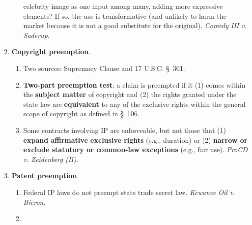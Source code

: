 \begin{enumerate}
\begin{enumerate}
        celebrity image as one input among many, adding more expressive 
        elements? If so, the use is transformative (and unlikely to harm the 
        market because it is not a good substitute for the original). 
        \emph{Comedy III v. Saderup}.
    \end{enumerate}
    \item \textbf{Copyright preemption}.
    \begin{enumerate}
        \item Two sources: Supremacy Clause and 17 U.S.C. \S\ 301.
        \item \textbf{Two-part preemption test}: a claim is preempted if it 
        (1) comes within the \textbf{subject matter} of copyright and (2) the 
        rights granted under the state law are \textbf{equivalent} to any of 
        the exclusive rights within the general scope of copyright as defined 
        in \S\ 106.
        \item Some contracts involving IP are enforceable, but not those that 
        (1) \textbf{expand affirmative exclusive rights} (e.g., duration) or 
        (2) \textbf{narrow or exclude statutory or common-law exceptions} 
        (e.g., fair use). \emph{ProCD v. Zeidenberg (II)}.
    \end{enumerate}
    \item \textbf{Patent preemption}.
    \begin{enumerate}
        \item Federal IP laws do not preempt state trade secret law. 
        \emph{Kewanee Oil v. Bicron}.
        \item 
    \end{enumerate}
\end{enumerate}
